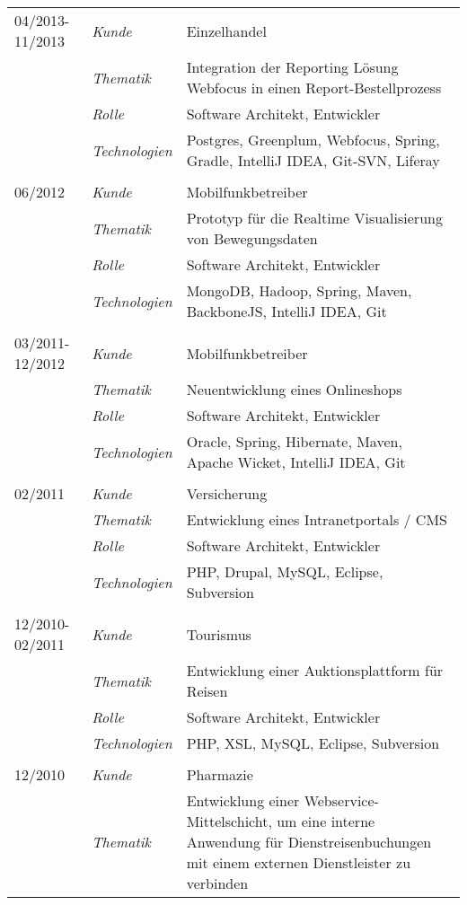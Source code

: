 \begin{longtable}{@{}>{}p{4cm}>{\itshape}p{2cm}>{}p{9cm}}
04/2013-11/2013     & Kunde 	    & Einzelhandel\\
\nopagebreak		& Thematik	    & Integration der Reporting Lösung Webfocus in einen Report-Bestellprozess\\
\nopagebreak		& Rolle 	    & Software Architekt, Entwickler\\
\nopagebreak		& Technologien	& Postgres, Greenplum, Webfocus, Spring, Gradle, IntelliJ IDEA, Git-SVN, Liferay\\
\\
06/2012             & Kunde 	    & Mobilfunkbetreiber\\
\nopagebreak		& Thematik	    & Prototyp für die Realtime Visualisierung von Bewegungsdaten \\
\nopagebreak		& Rolle 	    & Software Architekt, Entwickler\\
\nopagebreak		& Technologien	& MongoDB, Hadoop, Spring, Maven, BackboneJS, IntelliJ IDEA, Git\\
\\
03/2011-12/2012     & Kunde 	    & Mobilfunkbetreiber\\
\nopagebreak		& Thematik	    & Neuentwicklung eines Onlineshops \\
\nopagebreak		& Rolle 	    & Software Architekt, Entwickler\\
\nopagebreak		& Technologien	& Oracle, Spring, Hibernate, Maven, Apache Wicket, IntelliJ IDEA, Git\\
\\
02/2011             & Kunde 	    & Versicherung\\
\nopagebreak		& Thematik	    & Entwicklung eines Intranetportals / CMS\\
\nopagebreak		& Rolle 	    & Software Architekt, Entwickler\\
\nopagebreak		& Technologien	& PHP, Drupal, MySQL, Eclipse, Subversion\\
\\
12/2010-02/2011     & Kunde 	    & Tourismus\\
\nopagebreak		& Thematik	    & Entwicklung einer Auktionsplattform für Reisen\\
\nopagebreak		& Rolle 	    & Software Architekt, Entwickler\\
\nopagebreak		& Technologien	& PHP, XSL, MySQL, Eclipse, Subversion\\
\\
12/2010         	& Kunde 	    & Pharmazie\\
\nopagebreak		& Thematik	    & Entwicklung einer Webservice-Mittelschicht, um eine interne Anwendung für Dienstreisenbuchungen mit einem externen Dienstleister zu verbinden\\

\end{longtable}
